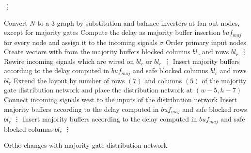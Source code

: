 \begin{algorithm}[H]
	\vdots
	
	\begin{algorithmic}
		\State Convert $N$ to a 3-graph by substitution and balance inverters at fan-out nodes, except for majority gates
		\State Compute the delay as majority buffer insertion $buf_{maj}$ for every node and assign it to the incoming signals $\sigma$
		\State Order primary input nodes
		\State Create vectors with from the majority buffers blocked columns $bl_c$ and rows $bl_r$
		\State \vdots
		\State Rewire incoming signals which are wired on $bl_c$ or $bl_r$
		\State \vdots
		\EndIf
		\State Insert majority buffers according to the delay computed in $buf_{maj}$ and safe blocked columns $bl_c$ and rows $bl_r$
		\State Extend the layout by number of rows $(7)$ and columns $(5)$ of the majority gate distribution network and place the distribution network at $(w-5, h-7)$
		\State Connect incoming signals west to the inputs of the distribution network
		\State Insert majority buffers according to the delay computed in $buf_{maj}$ and safe blocked rows $bl_r$
		\State \vdots
		\State Insert majority buffers according to the delay computed in $buf_{maj}$ and safe blocked columns $bl_c$
		\State \vdots
		\EndIf
		
		\EndFor
	\end{algorithmic}
	\caption{Ortho changes with majority gate distribution network}\label{alg:majority_network}
\end{algorithm}

